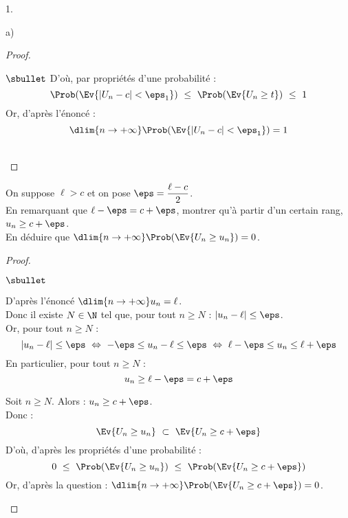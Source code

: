 \begin{noliste}{1.}
\begin{noliste}{a)}
\begin{proof}
\begin{noliste}{$\sbullet$}
	D'où, par propriétés d'une probabilité :
	\[
	  \Prob(\Ev{\vert U_n -c\vert < \eps_1}) \ \leq \
	  \Prob(\Ev{U_n \geq t}) \ \leq \ 1
	\]
	Or, d'après l'énoncé :
	\[
	  \dlim{n\to +\infty} \Prob(\Ev{\vert U_n - c \vert < \eps_1}) 
	  = 1
	\]
      \end{noliste}
      ~\\[-1cm]
    \end{proof}

    
    \item On suppose $\ell >c$ et on pose $\eps = 
    \dfrac{\ell-c}{2}$.\\
    En remarquant que $\ell-\eps=c+\eps$, montrer qu'à 
    partir d'un certain rang, $u_n \geq c+\eps$.\\
    En déduire que $\dlim{n \to +\infty}\Prob(\Ev{U_n \geq 
    u_n})=0$. 
    
    \begin{proof}~
      \begin{noliste}{$\sbullet$}
	\item D'après l'énoncé $\dlim{n\to+\infty}
	u_n = \ell$.\\
	Donc il existe $N\in \N$ tel que, pour tout $n\geq N$ :
	$\vert u_n - \ell \vert \leq \eps$.\\
	Or, pour tout $n \geq N$ :
	\[
	  \vert u_n - \ell \vert \leq \eps \ \Leftrightarrow \
	  -\eps \leq u_n - \ell \leq \eps \ \Leftrightarrow \
	  \ell - \eps \leq u_n \leq \ell + \eps
	\]
	En particulier, pour tout $n \geq N$ :
	\[
	  u_n \geq \ell - \eps = c+\eps
	\]
	
	\item Soit $n\geq N$. Alors : $u_n \geq c +\eps$.\\
	Donc :
	\[
	  \Ev{U_n \geq u_n} \ \subset \ \Ev{U_n \geq c+\eps}
	\]
	D'où, d'après les propriétés d'une probabilité :
	\[
	  0 \ \leq \ \Prob(\Ev{U_n \geq u_n}) \ \leq \ 
	  \Prob(\Ev{U_n \geq c+\eps})
	\]
	Or, d'après la question  : 
	$\dlim{n\to +\infty} \Prob(\Ev{U_n \geq c+\eps}) =0$.
      \end{noliste}
      

\end{proof}
\end{noliste}
\end{noliste}
